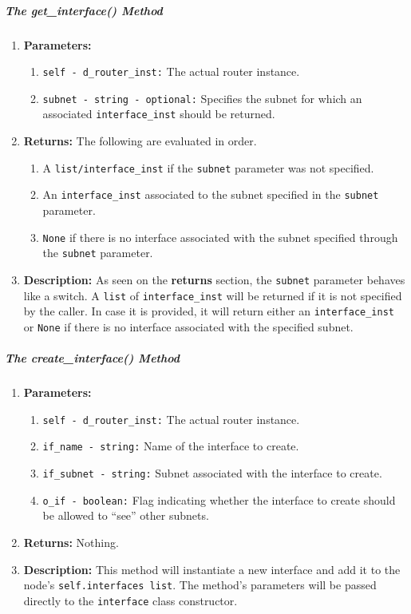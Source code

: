         \subparagraph{The get\_interface() Method}
            \begin{enumerate}
                \item \textbf{Parameters:}
                \begin{enumerate}
                    \item \texttt{self - d\_router\_inst:} The actual router instance.
                    \item \texttt{subnet - string - optional:} Specifies the subnet for which an associated \texttt{interface\_inst} should be returned.
                \end{enumerate}
                \item \textbf{Returns:} The following are evaluated in order.
                \begin{enumerate}
                    \item A \texttt{list/interface\_inst} if the \texttt{subnet} parameter was not specified.
                    \item An \texttt{interface\_inst} associated to the subnet specified in the \texttt{subnet} parameter.
                    \item \texttt{None} if there is no interface associated with the subnet specified through the \texttt{subnet} parameter.
                \end{enumerate}
                \item \textbf{Description:} As seen on the \textbf{returns} section, the \texttt{subnet} parameter behaves like a switch. A \texttt{list} of \texttt{interface\_inst} will be returned if it is not specified by the caller. In case it is provided, it will return either an \texttt{interface\_inst} or \texttt{None} if there is no interface associated with the specified subnet.
            \end{enumerate}

        \subparagraph{The create\_interface() Method}
            \begin{enumerate}
                \item \textbf{Parameters:}
                \begin{enumerate}
                    \item \texttt{self - d\_router\_inst:} The actual router instance.
                    \item \texttt{if\_name - string:} Name of the interface to create.
                    \item \texttt{if\_subnet - string:} Subnet associated with the interface to create.
                    \item \texttt{o\_if - boolean:} Flag indicating whether the interface to create should be allowed to ``see'' other subnets.
                \end{enumerate}
                \item \textbf{Returns:} Nothing.
                \item \textbf{Description:} This method will instantiate a new interface and add it to the node's \texttt{self.interfaces list}. The method's parameters will be passed directly to the \texttt{interface} class constructor.
            \end{enumerate}

